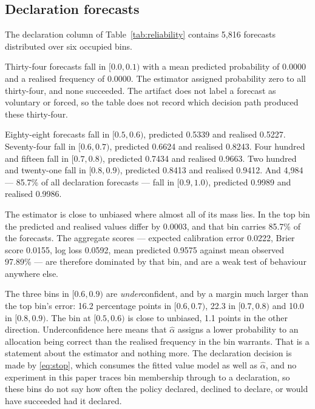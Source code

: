 \documentclass[11pt]{article}
\theoremstyle{definition}
\newcommand{\numDeclECE}{0.0222}
\newcommand{\numDeclObs}{97.89}
\newcommand{\numDeclN}{5{,}816}
\newcommand{\numDeclBrier}{0.0155}
\newcommand{\numDeclLogLoss}{0.0592}
\newcommand{\numDeclTopBinShare}{85.7}
\begin{document}
\subsection{Declaration forecasts}
\label{app:calib-decl}

The declaration column of Table~\ref{tab:reliability} contains
\numDeclN{} forecasts distributed over six occupied bins.

Thirty-four forecasts fall in $[0.0,0.1)$ with a mean predicted probability of
0.0000 and a realised frequency of 0.0000. The estimator assigned probability
zero to all thirty-four, and none succeeded. The artifact does not label a
forecast as voluntary or forced, so the table does not record which decision
path produced these thirty-four.

Eighty-eight forecasts fall in $[0.5,0.6)$, predicted 0.5339 and realised
0.5227. Seventy-four fall in $[0.6,0.7)$, predicted 0.6624 and realised 0.8243.
Four hundred and fifteen fall in $[0.7,0.8)$, predicted 0.7434 and realised
0.9663. Two hundred and twenty-one fall in $[0.8,0.9)$, predicted 0.8413 and
realised 0.9412. And 4{,}984 --- \numDeclTopBinShare\% of all
declaration forecasts --- fall in $[0.9,1.0)$, predicted 0.9989 and realised
0.9986.

The estimator is close to unbiased where almost all of its mass lies. In
the top bin the predicted and realised values differ by 0.0003, and that bin
carries \numDeclTopBinShare\% of the forecasts. The aggregate scores ---
expected calibration error \numDeclECE{}, Brier score \numDeclBrier{}, log loss
\numDeclLogLoss{}, mean predicted 0.9575 against mean observed
\numDeclObs\% --- are therefore dominated by that bin, and are a weak test of
behaviour anywhere else.

The three bins in $[0.6,0.9)$ are \emph{under}confident, and by a margin much
larger than the top bin's error: 16.2 percentage points in $[0.6,0.7)$, 22.3 in
$[0.7,0.8)$ and 10.0 in $[0.8,0.9)$. The bin at $[0.5,0.6)$ is close to
unbiased, 1.1 points in the other direction. Underconfidence here means that
$\hat\alpha$ assigns a lower probability to an allocation being correct than the
realised frequency in the bin warrants. That is a statement about the estimator
and nothing more. The declaration decision is made by \eqref{eq:stop}, which
consumes the fitted value model as well as $\hat\alpha$, and no experiment in
this paper traces bin membership through to a declaration, so these bins do not
say how often the policy declared, declined to declare, or would have succeeded
had it declared.
\end{document}
